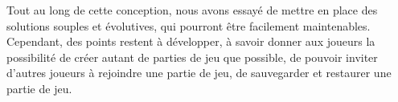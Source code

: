 \par

Tout au long de cette conception, nous avons essayé de mettre en place des solutions souples et évolutives, qui pourront être facilement maintenables. \\

Cependant, des points restent à développer, à savoir donner aux joueurs la possibilité de créer autant de parties de jeu que possible, de pouvoir inviter d'autres joueurs à rejoindre une partie de jeu, de sauvegarder et restaurer une partie de jeu.